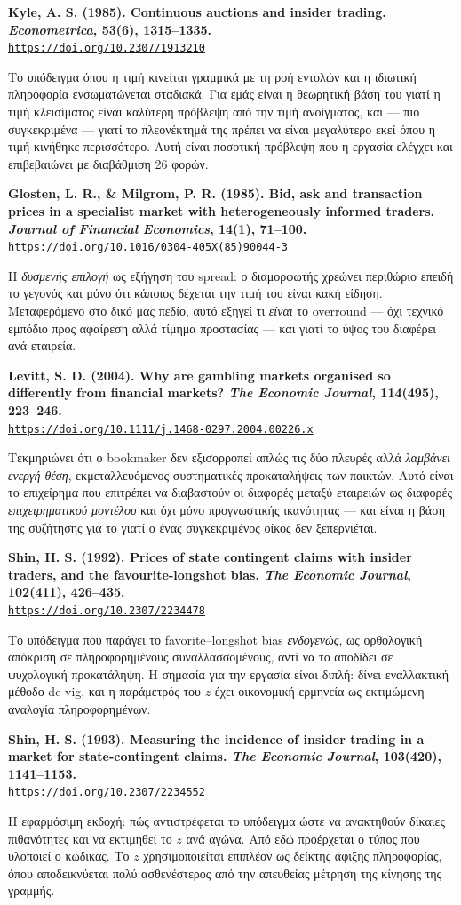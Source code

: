 \documentclass[11pt,a4paper]{article}
\newcommand{\src}[3]{%
  \par\medskip\noindent\textbf{#2}\\
  \href{#3}{\texttt{\small #3}}\par\smallskip}
\begin{document}
\src{kyle1985}{Kyle, A. S. (1985). Continuous auctions and insider trading.
\emph{Econometrica}, 53(6), 1315--1335.}
{https://doi.org/10.2307/1913210}
Το υπόδειγμα όπου η τιμή κινείται γραμμικά με τη ροή εντολών και η ιδιωτική πληροφορία
ενσωματώνεται σταδιακά. Για εμάς είναι η θεωρητική βάση του γιατί η τιμή κλεισίματος είναι
καλύτερη πρόβλεψη από την τιμή ανοίγματος, και --- πιο συγκεκριμένα --- γιατί το πλεονέκτημά
της πρέπει να είναι μεγαλύτερο εκεί όπου η τιμή κινήθηκε περισσότερο. Αυτή είναι ποσοτική
πρόβλεψη που η εργασία ελέγχει και επιβεβαιώνει με διαβάθμιση 26 φορών.

\src{glosten1985}{Glosten, L. R., \& Milgrom, P. R. (1985). Bid, ask and transaction prices in
a specialist market with heterogeneously informed traders. \emph{Journal of Financial
Economics}, 14(1), 71--100.}
{https://doi.org/10.1016/0304-405X(85)90044-3}
Η \emph{δυσμενής επιλογή} ως εξήγηση του spread: ο διαμορφωτής χρεώνει περιθώριο επειδή το
γεγονός και μόνο ότι κάποιος δέχεται την τιμή του είναι κακή είδηση. Μεταφερόμενο στο δικό
μας πεδίο, αυτό εξηγεί τι \emph{είναι} το overround --- όχι τεχνικό εμπόδιο προς αφαίρεση
αλλά τίμημα προστασίας --- και γιατί το ύψος του διαφέρει ανά εταιρεία.

\src{levitt2004}{Levitt, S. D. (2004). Why are gambling markets organised so differently from
financial markets? \emph{The Economic Journal}, 114(495), 223--246.}
{https://doi.org/10.1111/j.1468-0297.2004.00226.x}
Τεκμηριώνει ότι ο bookmaker δεν εξισορροπεί απλώς τις δύο πλευρές αλλά \emph{λαμβάνει ενεργή
θέση}, εκμεταλλευόμενος συστηματικές προκαταλήψεις των παικτών. Αυτό είναι το επιχείρημα που
επιτρέπει να διαβαστούν οι διαφορές μεταξύ εταιρειών ως διαφορές \emph{επιχειρηματικού
μοντέλου} και όχι μόνο προγνωστικής ικανότητας --- και είναι η βάση της συζήτησης για το
γιατί ο ένας συγκεκριμένος οίκος δεν ξεπερνιέται.

\src{shin1992}{Shin, H. S. (1992). Prices of state contingent claims with insider traders, and
the favourite-longshot bias. \emph{The Economic Journal}, 102(411), 426--435.}
{https://doi.org/10.2307/2234478}
Το υπόδειγμα που παράγει το favorite--longshot bias \emph{ενδογενώς}, ως ορθολογική απόκριση
σε πληροφορημένους συναλλασσομένους, αντί να το αποδίδει σε ψυχολογική προκατάληψη. Η
σημασία για την εργασία είναι διπλή: δίνει εναλλακτική μέθοδο de-vig, και η παράμετρός του
$z$ έχει οικονομική ερμηνεία ως εκτιμώμενη αναλογία πληροφορημένων.

\src{shin1993}{Shin, H. S. (1993). Measuring the incidence of insider trading in a market for
state-contingent claims. \emph{The Economic Journal}, 103(420), 1141--1153.}
{https://doi.org/10.2307/2234552}
Η εφαρμόσιμη εκδοχή: πώς αντιστρέφεται το υπόδειγμα ώστε να ανακτηθούν δίκαιες πιθανότητες
και να εκτιμηθεί το $z$ ανά αγώνα. Από εδώ προέρχεται ο τύπος που υλοποιεί ο κώδικας. Το
$z$ χρησιμοποιείται επιπλέον ως δείκτης άφιξης πληροφορίας, όπου αποδεικνύεται πολύ
ασθενέστερος από την απευθείας μέτρηση της κίνησης της γραμμής.
\end{document}
